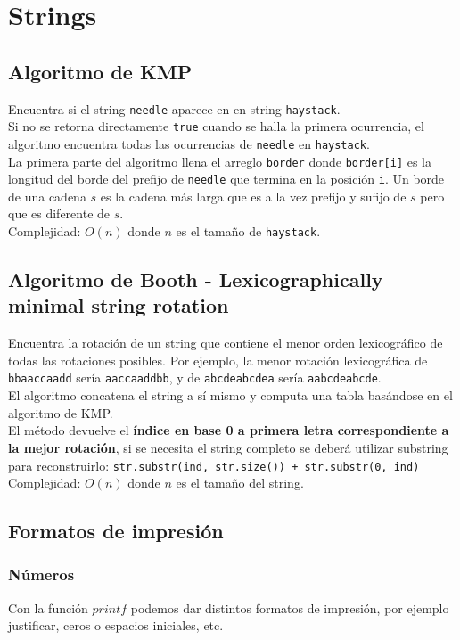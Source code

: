 \documentclass[10pt,letterpaper,twocolumn]{article}
\newcommand{\source}[1]{
	
	\dotfill
}
\begin{document}
\section{Strings}
	\subsection{Algoritmo de KMP}
		Encuentra si el string \verb|needle| aparece en en string \verb|haystack|.\\
		Si no se retorna directamente \verb|true| cuando se halla la primera ocurrencia, el algoritmo encuentra todas las ocurrencias de \verb|needle| en \verb|haystack|.\\
		La primera parte del algoritmo llena el arreglo \verb|border| donde \verb|border[i]| es la longitud del borde del prefijo de \verb|needle| que termina en la posición \verb|i|. Un borde de una cadena $s$ es la cadena más larga que es a la vez prefijo y sufijo de $s$ pero que es diferente de $s$.\\
		Complejidad: $O(n)$ donde $n$ es el tamaño de \verb|haystack|.\\
		\source{./src/kmp.cpp}

	\subsection{Algoritmo de Booth - Lexicographically minimal string rotation}
		Encuentra la rotación de un string que contiene el menor orden lexicográfico de todas las rotaciones posibles. Por ejemplo, la menor rotación lexicográfica de \texttt{bbaaccaadd} sería \texttt{aaccaaddbb}, y de \texttt{abcdeabcdea} sería \texttt{aabcdeabcde}. \\
		El algoritmo concatena el string a sí mismo y computa una tabla basándose en el algoritmo de KMP.\\
		El método devuelve el \textbf{índice en base 0 a primera letra correspondiente a la mejor rotación}, si se necesita el string completo se deberá utilizar substring para reconstruirlo: \texttt{str.substr(ind, str.size()) + str.substr(0, ind)}\\
Complejidad: $O(n)$ donde $n$ es el tamaño del string.
		\source{./src/booths.cpp}

	\subsection{Formatos de impresión}
		\subsubsection{Números}
		Con la función $printf$ podemos dar distintos formatos de impresión, por ejemplo justificar, ceros o espacios iniciales, etc.
			\source{./src/printFormat.cpp}
\end{document}
